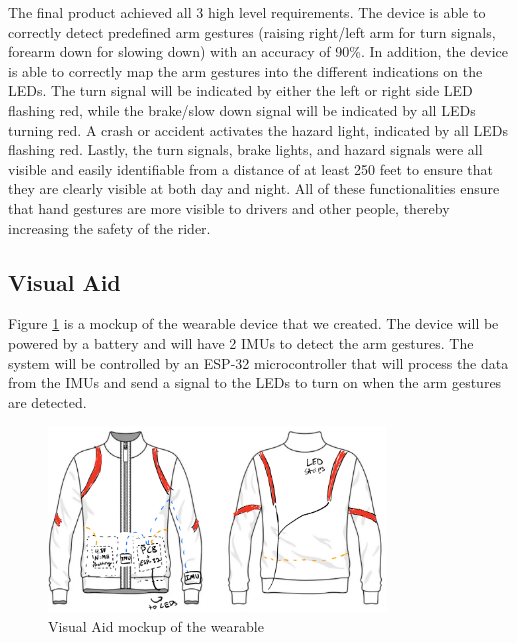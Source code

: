 The final product achieved all 3 high level requirements. The device is able to correctly detect predefined arm gestures (raising right/left arm for turn signals, forearm down for slowing down) with an accuracy of 90\%. In addition, the device is able to correctly map the arm gestures into the different indications on the LEDs. The turn signal will be indicated by either the left or right side LED flashing red, while the brake/slow down signal will be indicated by all LEDs turning red. A crash or accident activates the hazard light, indicated by all LEDs flashing red. Lastly, the turn signals, brake lights, and hazard signals were all visible and easily identifiable from a distance of at least 250 feet to ensure that they are clearly visible at both day and night. All of these functionalities ensure that hand gestures are more visible to drivers and other people, thereby increasing the safety of the rider.
\newpage

\subsection{Visual Aid}
Figure \ref{fig:vis_aid} is a mockup of the wearable device that we created. The device will be powered by a battery and will have 2 IMUs to detect the arm gestures. The system will be controlled by an ESP-32 microcontroller that will process the data from the IMUs and send a signal to the LEDs to turn on when the arm gestures are detected.
\begin{figure}[ht]
    \centering
    \includegraphics[width=0.8\textwidth]{images/visual_aid_new.jpg}
    \caption{Visual Aid mockup of the wearable \cite{VectorStock2024}}
    \label{fig:vis_aid}
\end{figure}

